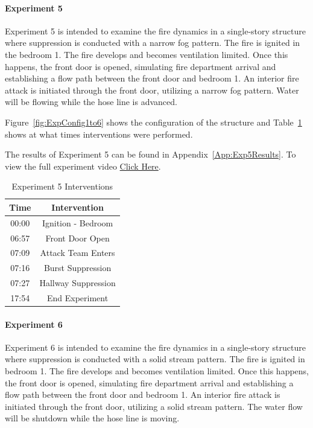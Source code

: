 \documentclass[12pt,oneside]{book}
\begin{document}
\clearpage

\paragraph{Experiment 5} \mbox{}

Experiment 5 is intended to examine the fire dynamics in a single-story structure where suppression is conducted with a narrow fog pattern. The fire is ignited in the bedroom 1. The fire develops and becomes ventilation limited. Once this happens, the front door is opened, simulating fire department arrival and establishing a flow path between the front door and bedroom 1. An interior fire attack is initiated through the front door, utilizing a narrow fog pattern. Water will be flowing while the hose line is advanced.  

Figure~\ref{fig:ExpConfig1to6} shows the configuration of the structure and Table~\ref{Table:Exp5Interventions} shows at what times interventions were performed. 

The results of Experiment 5 can be found in Appendix~\ref{App:Exp5Results}. To view the full experiment video \href{https://youtu.be/gl8rc1Nsl1k}{Click Here}.

\begin{table}[H]
	\centering
	\caption{Experiment 5 Interventions}
	\begin{tabular}{|c|c|} 
		\hline
		Time & Intervention \\ \hline \hline
		00:00 & Ignition - Bedroom \\ \hline
		06:57 & Front Door Open \\ \hline
		07:09 & Attack Team Enters\\ \hline
		07:16 & Burst Suppression \\ \hline 
		07:27 & Hallway Suppression \\ \hline
		17:54 & End Experiment\\ \hline
	\end{tabular}
	\label{Table:Exp5Interventions}
\end{table}

\clearpage

\paragraph{Experiment 6} \mbox{}

Experiment 6 is intended to examine the fire dynamics in a single-story structure where suppression is conducted with a solid stream pattern. The fire is ignited in bedroom 1. The fire develops and becomes ventilation limited. Once this happens, the front door is opened, simulating fire department arrival and establishing a flow path between the front door and bedroom 1. An interior fire attack is initiated through the front door, utilizing a solid stream pattern. The water flow will be shutdown while the hose line is moving. 
\end{document}
